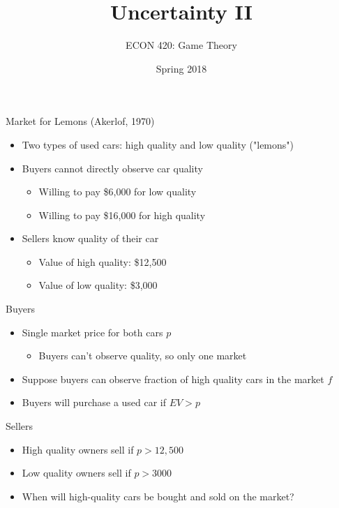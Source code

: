 \documentclass[10pt]{beamer}
\author{ECON 420: Game Theory}
\date{Spring 2018}
\title{Uncertainty II}
\begin{document}
\maketitle

\begin{frame}[label={sec:org6bc779d}]{}
\alert{Market for Lemons (Akerlof, 1970)}
\begin{itemize}
\item Two types of used cars: high quality and low quality ("lemons")
\item Buyers cannot directly observe car quality
\begin{itemize}
\item Willing to pay \$6,000 for low quality
\item Willing to pay \$16,000 for high quality
\end{itemize}
\item Sellers know quality of their car
\begin{itemize}
\item Value of high quality: \$12,500
\item Value of low quality: \$3,000
\end{itemize}
\end{itemize}
\end{frame}

\begin{frame}[label={sec:org272ebec}]{}
\alert{Buyers}
\begin{itemize}
\item Single market price for both cars \(p\)
\begin{itemize}
\item Buyers can't observe quality, so only one market
\end{itemize}
\item Suppose buyers can observe fraction of high quality cars in the market \(f\)
\item Buyers will purchase a used car if \(EV > p\)
\end{itemize}
\end{frame}

\begin{frame}[label={sec:orgcdfb299}]{}
\alert{Sellers}
\begin{itemize}
\item High quality owners sell if \(p>12,500\)
\item Low quality owners sell if \(p>3000\)
\item When will high-quality cars be bought and sold on the market?
\end{itemize}
\end{frame}
\end{document}
